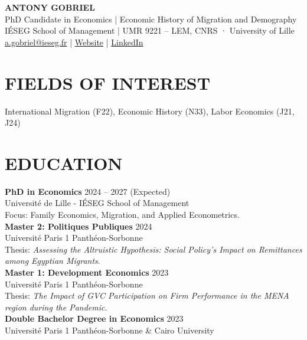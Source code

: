 \documentclass[a4paper,9pt]{extarticle}
\begin{document}
\pagestyle{empty}

\begin{center}
    \textbf{\Large ANTONY GOBRIEL }\\[3pt]
    PhD Candidate in Economics | Economic History of Migration and Demography \\
    IÉSEG School of Management | UMR 9221 – LEM, CNRS · University of Lille\\
    \href{mailto:a.gobriel@ieseg.fr}{a.gobriel@ieseg.fr} | \href{https://antonygobriel.github.io/AntonyGobriel.io/}{Website} 
    | \href{https://www.linkedin.com/in/antony-gobriel/}{LinkedIn}
\end{center}


\section*{FIELDS OF INTEREST}
\noindent
International Migration (F22), Economic History (N33), Labor Economics (J21, J24) \\

\section*{EDUCATION}

    \noindent
    \textbf{PhD in Economics} \hfill 2024 -- 2027 (Expected) \\ 
    Université de Lille - IÉSEG School of Management \\ 
    Focus: Family Economics, Migration, and Applied Econometrics. \\

    \noindent
    \textbf{Master 2: Politiques Publiques} \hfill 2024 \\ 
    Université Paris 1 Panthéon-Sorbonne \\ 
    Thesis: \textit{Assessing the Altruistic Hypothesis: Social Policy's Impact on Remittances among Egyptian Migrants}. \\

    \noindent
    \textbf{Master 1: Development Economics} \hfill 2023 \\ 
    Université Paris 1 Panthéon-Sorbonne \\ 
    Thesis: \textit{The Impact of GVC Participation on Firm Performance in the MENA region during the Pandemic}. \\

    \noindent
    \textbf{Double Bachelor Degree in Economics} \hfill 2023 \\ 
    Université Paris 1 Panthéon-Sorbonne \& Cairo University \\ 
\end{document}

